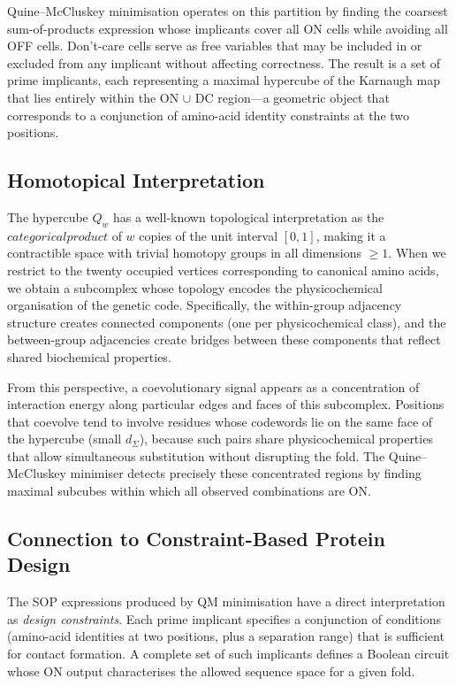 Quine--McCluskey minimisation operates on this partition by finding the
coarsest sum-of-products expression whose implicants cover all ON cells while
avoiding all OFF cells.  Don't-care cells serve as free variables that may be
included in or excluded from any implicant without affecting correctness.
The result is a set of prime implicants, each representing a maximal
hypercube of the Karnaugh map that lies entirely within the ON $\cup$ DC
region---a geometric object that corresponds to a conjunction of amino-acid
identity constraints at the two positions.

\subsection{Homotopical Interpretation}

The hypercube $Q_w$ has a well-known topological interpretation as the
$categorical product$ of $w$ copies of the unit interval $[0,1]$, making it a
contractible space with trivial homotopy groups in all dimensions $\geq 1$.
When we restrict to the twenty occupied vertices corresponding to canonical
amino acids, we obtain a subcomplex whose topology encodes the
physicochemical organisation of the genetic code.  Specifically, the
within-group adjacency structure creates connected components (one per
physicochemical class), and the between-group adjacencies create bridges
between these components that reflect shared biochemical properties.

From this perspective, a coevolutionary signal appears as a concentration of
interaction energy along particular edges and faces of this subcomplex.
Positions that coevolve tend to involve residues whose codewords lie on the
same face of the hypercube (small $d_\Sigma$), because such pairs share
physicochemical properties that allow simultaneous substitution without
disrupting the fold.  The Quine--McCluskey minimiser detects precisely these
concentrated regions by finding maximal subcubes within which all observed
combinations are ON.

\subsection{Connection to Constraint-Based Protein Design}

The SOP expressions produced by QM minimisation have a direct interpretation
as \emph{design constraints}.  Each prime implicant specifies a conjunction
of conditions (amino-acid identities at two positions, plus a separation
range) that is sufficient for contact formation.  A complete set of such
implicants defines a Boolean circuit whose ON output characterises the
allowed sequence space for a given fold.

